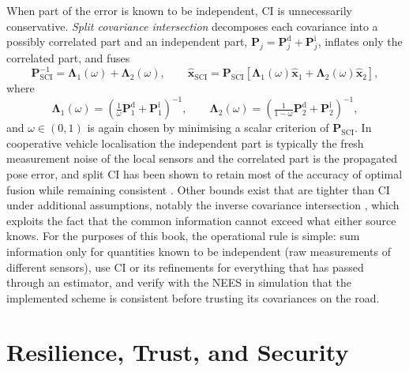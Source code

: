 When part of the error is known to be independent, CI is unnecessarily conservative. \emph{Split covariance intersection} \cite{julier2001_split_ci} decomposes each covariance into a possibly correlated part and an independent part, $\mathbf{P}_j=\mathbf{P}_j^{\mathrm{d}}+\mathbf{P}_j^{\mathrm{i}}$, inflates only the correlated part, and fuses
\begin{equation}
\mathbf{P}_{\mathrm{SCI}}^{-1}=\mathbf{\Lambda}_1(\omega)+\mathbf{\Lambda}_2(\omega),\qquad
\widehat{\mathbf{x}}_{\mathrm{SCI}}=\mathbf{P}_{\mathrm{SCI}}\left[\mathbf{\Lambda}_1(\omega)\widehat{\mathbf{x}}_1+\mathbf{\Lambda}_2(\omega)\widehat{\mathbf{x}}_2\right],
\label{eq:split-ci}
\end{equation}
where
\begin{equation}
\mathbf{\Lambda}_1(\omega)=\left(\tfrac{1}{\omega}\mathbf{P}_1^{\mathrm{d}}+\mathbf{P}_1^{\mathrm{i}}\right)^{-1},\qquad
\mathbf{\Lambda}_2(\omega)=\left(\tfrac{1}{1-\omega}\mathbf{P}_2^{\mathrm{d}}+\mathbf{P}_2^{\mathrm{i}}\right)^{-1},
\label{eq:split-ci-terms}
\end{equation}
and $\omega\in(0,1)$ is again chosen by minimising a scalar criterion of $\mathbf{P}_{\mathrm{SCI}}$.
In cooperative vehicle localisation the independent part is typically the fresh measurement noise of the local sensors and the correlated part is the propagated pose error, and split CI has been shown to retain most of the accuracy of optimal fusion while remaining consistent \cite{li2013_split_ci_vehicles}. Other bounds exist that are tighter than CI under additional assumptions, notably the inverse covariance intersection \cite{noack2017_ici}, which exploits the fact that the common information cannot exceed what either source knows. For the purposes of this book, the operational rule is simple: sum information only for quantities known to be independent (raw measurements of different sensors), use CI or its refinements for everything that has passed through an estimator, and verify with the NEES in simulation that the implemented scheme is consistent before trusting its covariances on the road.


\section{Resilience, Trust, and Security}
\label{sec:mas-resilience}

